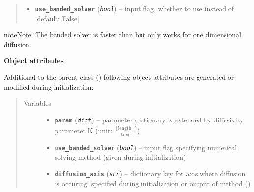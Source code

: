 \documentclass[a4paper,10pt,english]{sphinxmanual}
\begin{document}
\begin{fulllineitems}
\begin{quote}
\begin{description}
\begin{itemize}
\item {} 
\textbf{\texttt{use\_banded\_solver}} (\href{http://docs.python.org/2.7/library/functions.html\#bool}{\emph{\texttt{bool}}}) -- input flag, whether to use 
\href{http://docs.scipy.org/doc/scipy/reference/generated/scipy.linalg.solve\_banded.html\#scipy.linalg.solve\_banded}{}
instead of \href{http://docs.scipy.org/doc/numpy/reference/generated/numpy.linalg.solve.html\#numpy.linalg.solve}{}
{[}default: False{]}

\end{itemize}

\end{description}\end{quote}

\begin{notice}{note}{Note:}
The banded solver \href{http://docs.scipy.org/doc/scipy/reference/generated/scipy.linalg.solve\_banded.html\#scipy.linalg.solve\_banded}{} is faster than 
\href{http://docs.scipy.org/doc/numpy/reference/generated/numpy.linalg.solve.html\#numpy.linalg.solve}{} but only works for one dimensional diffusion.
\end{notice}

\textbf{Object attributes}

Additional to the parent class 
{\hyperref[api/climlab.process:climlab.process.implicit.ImplicitProcess]{\emph{}}} ()
following object attributes are generated or modified during initialization:
\begin{quote}\begin{description}
\item[{Variables}] \leavevmode\begin{itemize}
\item {} 
\textbf{\texttt{param}} (\href{http://docs.python.org/2.7/library/stdtypes.html\#dict}{\emph{\texttt{dict}}}) -- parameter dictionary is extended by 
diffusivity parameter K (unit:
\(\frac{[\textrm{length}]^2}{\textrm{time}}\))

\item {} 
\textbf{\texttt{use\_banded\_solver}} (\href{http://docs.python.org/2.7/library/functions.html\#bool}{\emph{\texttt{bool}}}) -- input flag specifying numerical solving 
method (given during initialization)

\item {} 
\textbf{\texttt{diffusion\_axis}} (\href{http://docs.python.org/2.7/library/functions.html\#str}{\emph{\texttt{str}}}) -- dictionary key for axis where diffusion 
is occuring: 
specified during initialization
or output of method 
{\hyperref[api/climlab.dynamics:climlab.dynamics.diffusion._guess_diffusion_axis]{\emph{}}} ()


\end{itemize}
\end{description}
\end{quote}
\end{fulllineitems}
\end{document}
